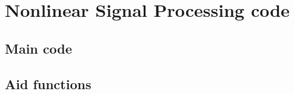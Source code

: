 \section{Nonlinear Signal Processing code}

\subsection{Main code}

\subsection{Aid functions}






































